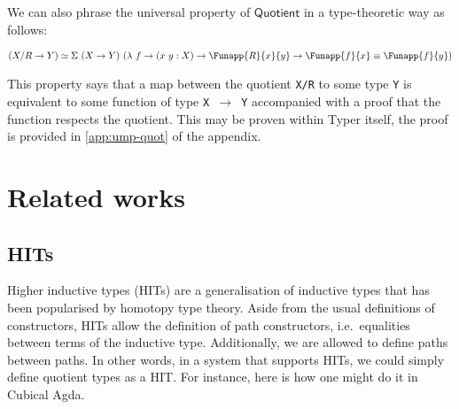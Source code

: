 \documentclass[12pt,twoside,maitrise]{dms}
\theoremstyle{definition}
\numberwithin{equation}{section}
\numberwithin{table}{chapter}
\numberwithin{figure}{chapter}
\newcommand\kw[1] {\textsf{#1}}
\newcommand\id[1] {\texttt{#1}}
\newcommand\fn[1] {\texttt{#1}}
\begin{document}
We can also phrase the universal property of $\kw{Quotient}$ in a type-theoretic
way as follows:

\begin{align*}
  & (X/R \rightarrow Y) \simeq \Sigma \ (X \rightarrow Y) \ (\lambda \ f \rightarrow (x \ y : X) \rightarrow \Funapp{R}{x}{y} \rightarrow \Funapp{f}{x} \equiv \Funapp{f}{y}) \\
\end{align*}

This property says that a map between the quotient \fn{X/R} to some type \id{Y}
is equivalent to some function of type \fn{X $\rightarrow$ Y} accompanied with a
proof that the function respects the quotient. This may be proven within Typer
itself, the proof is provided in \autoref{app:ump-quot} of the appendix.

\chapter{Related works}



\section{HITs}
Higher inductive types (HITs) are a generalisation of inductive types that has
been popularised by homotopy type theory\cite{HoTTbook}. Aside from the usual
definitions of constructors, HITs allow the definition of path constructors,
i.e.\ equalities between terms of the inductive type. Additionally, we are
allowed to define paths between paths. In other words, in a system that supports
HITs, we could simply define quotient types as a HIT. For instance, here is how
one might do it in Cubical Agda.
\end{document}
